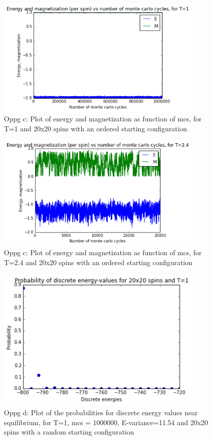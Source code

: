 \documentclass[twocolumn]{article}
\begin{document}
\begin{figure}[h!]
  \centering
  \caption{Oppg c: Plot of energy and magnetization as function of mcs, for T=1 and 20x20 spins with an ordered starting configuration}
  \includegraphics[width=10cm]{E_M_plot_c_3.png}
\end{figure}

\begin{figure}[h!]
  \centering
  \caption{Oppg c: Plot of energy and magnetization as function of mcs, for T=2.4 and 20x20 spins with an ordered starting configuration}
  \includegraphics[width=10cm]{E_M_plot_c_4.png}
\end{figure}

\begin{figure}[H]
  \centering
  \caption{Oppg d: Plot of the probabilities for discrete energy values near equilibrium, for T=1, mcs = 1000000, E-variance=11.54 and 20x20 spins with a random starting configuration}
  \includegraphics[width=10cm]{FYS3150_Proj4d_plot.png}
\end{figure}
\end{document}

